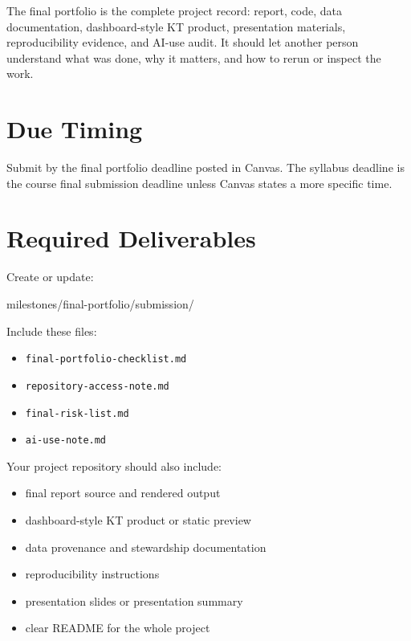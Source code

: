 \documentclass[
  letterpaper,
  DIV=11,
  numbers=noendperiod,
  oneside]{scrreprt}
\newenvironment{Shaded}{\begin{snugshade}}{\end{snugshade}}
\newcommand{\NormalTok}[1]{\textcolor[rgb]{0.00,0.23,0.31}{#1}}
\providecommand{\tightlist}{%
  \setlength{\itemsep}{0pt}\setlength{\parskip}{0pt}}
\begin{document}
The final portfolio is the complete project record: report, code, data
documentation, dashboard-style KT product, presentation materials,
reproducibility evidence, and AI-use audit. It should let another person
understand what was done, why it matters, and how to rerun or inspect
the work.

\section{Due Timing}\label{due-timing-6}

Submit by the final portfolio deadline posted in Canvas. The syllabus
deadline is the course final submission deadline unless Canvas states a
more specific time.

\section{Required Deliverables}\label{required-deliverables-6}

Create or update:

\begin{Shaded}
\begin{Highlighting}[numbers=left,,]
\NormalTok{milestones/final{-}portfolio/submission/}
\end{Highlighting}
\end{Shaded}

Include these files:

\begin{itemize}
\tightlist
\item
  \texttt{final-portfolio-checklist.md}
\item
  \texttt{repository-access-note.md}
\item
  \texttt{final-risk-list.md}
\item
  \texttt{ai-use-note.md}
\end{itemize}

Your project repository should also include:

\begin{itemize}
\tightlist
\item
  final report source and rendered output
\item
  dashboard-style KT product or static preview
\item
  data provenance and stewardship documentation
\item
  reproducibility instructions
\item
  presentation slides or presentation summary
\item
  clear README for the whole project
\end{itemize}
\end{document}
